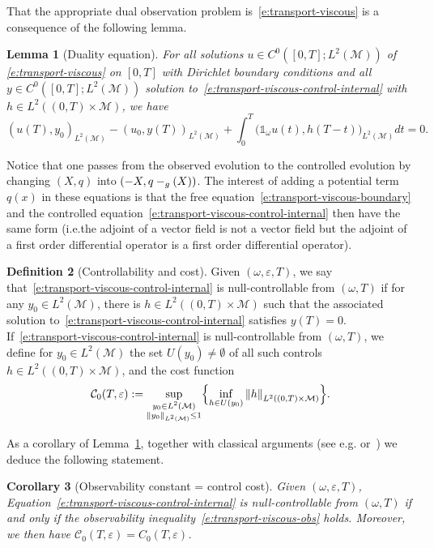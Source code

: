 \documentclass[10pt]{amsart}
\newtheorem{lemma}{Lemma}[section]
\newtheorem{corollary}[lemma]{Corollary}
\theoremstyle{definition}
\newtheorem{definition}[lemma]{Definition}
\newcommand{\M}{\ensuremath{\mathcal M}}
\let \div \relax
\DeclareMathOperator{\div}{div}
\newcommand\nor[2]{\left\|#1\right\|_{#2}}
\let\eps\varepsilon
\providecommand{\eg}{e.g.}\providecommand{\ie}{i.e.}\providecommand{\etc}{etc.}
\begin{document}
That the appropriate dual observation problem is~\eqref{e:transport-viscous} is a consequence of the following lemma.
\begin{lemma}[Duality equation]
\label{l:duality-equation-1}
For all solutions $u \in C^0([0,T]; L^2(\M))$ of \eqref{e:transport-viscous} on $[0,T]$ with Dirichlet boundary conditions and all $y\in C^0([0,T]; L^2(\M))$ solution to~\eqref{e:transport-viscous-control-internal} with $h \in L^2((0,T)\times \M)$, we have
\begin{equation}
\label{e:duality-equation-1}
(u(T), y_0)_{L^2(\M)} - (u_0, y(T))_{L^2(\M)} +\int_0^T\big(\mathds{1}_\omega u(t), h(T-t) \big)_{L^2(\M)} dt =0.
\end{equation}
\end{lemma}

Notice that one passes from the observed evolution to the controlled evolution by changing $(X, q)$ into $(-X, q-\div_{g}(X))$. The interest of adding a potential term $q(x)$ in these equations is that the free equation~\eqref{e:transport-viscous-boundary} and the controlled equation~\eqref{e:transport-viscous-control-internal} then have the same form (\ie the adjoint of a vector field is not a vector field but the adjoint of a first order differential operator is a first order differential operator).

\begin{definition}[Controllability and cost]
Given $(\omega, \eps, T)$, we say that~\eqref{e:transport-viscous-control-internal} is null-controllable from $(\omega, T)$ if for any $y_0 \in L^2(\M)$, there is $h \in L^2((0,T)\times \M)$ such that the associated solution to~\eqref{e:transport-viscous-control-internal} satisfies $y(T) =0$.
If~\eqref{e:transport-viscous-control-internal} is null-controllable from $(\omega, T)$, we define for $y_0 \in L^2(\M)$ the set $U(y_0) \neq \emptyset$ of all such controls $h \in L^2((0,T)\times \M)$, and the cost function
\[
\mathcal{C}_0(T,\eps) := \sup_{\substack{y_0 \in L^2(\M)\\ \nor{y_0}{L^2(\M)}\leq 1}} \Bigl\{\inf_{h \in U(y_0)} \nor{h}{L^2((0,T)\times \M)} \Bigr\}.
\]
\end{definition}
As a corollary of Lemma~\ref{l:duality-equation-1}, together with classical arguments (see \eg \cite{DR:77} or~\cite[Chap.\,2.3]{Cor:book}) we deduce the following statement.
\begin{corollary}[Observability constant = control cost]
\label{c:obscontrol}
Given $(\omega, \eps, T)$, Equation~\eqref{e:transport-viscous-control-internal} is null-controllable from $(\omega, T)$ if and only if the observability inequality~\eqref{e:transport-viscous-obs} holds.
Moreover, we then have $\mathcal{C}_0(T,\eps)= C_0(T,\eps)$.
\end{corollary}
\end{document}
